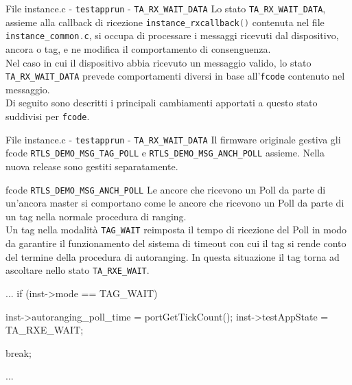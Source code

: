 \begin{frame}{File instance.c - \lstinline[language=C]!testapprun! - \lstinline[language=C]!TA_RX_WAIT_DATA!}
  Lo stato \lstinline[language=C]!TA_RX_WAIT_DATA!, assieme alla callback di ricezione \lstinline[language=C]!instance_rxcallback()!
  contenuta nel file \lstinline[language=C]!instance_common.c!, si occupa di processare i messaggi ricevuti dal dispositivo,
  ancora o tag, e ne modifica il comportamento di consenguenza.\\
  Nel caso in cui il dispositivo abbia ricevuto un messaggio valido, lo stato \lstinline[language=C]!TA_RX_WAIT_DATA!
  prevede comportamenti diversi in base all'\lstinline[language=C]!fcode! contenuto nel messaggio.\\
  Di seguito sono descritti i principali \alert{cambiamenti} apportati a questo stato suddivisi
  per \lstinline[language=C]!fcode!.
\end{frame}

\begin{frame}[fragile, shrink=30]{File instance.c - \lstinline[language=C]!testapprun! - \lstinline[language=C]!TA_RX_WAIT_DATA!}
  Il firmware originale gestiva gli fcode \lstinline[language=C]!RTLS_DEMO_MSG_TAG_POLL! e
  \lstinline[language=C]!RTLS_DEMO_MSG_ANCH_POLL! assieme. Nella nuova release sono gestiti separatamente.
  \begin{block}{fcode \lstinline[language=C]!RTLS_DEMO_MSG_ANCH_POLL!}
    Le ancore che ricevono un Poll da parte di un'ancora master si comportano come le ancore
    che ricevono un Poll da parte di un tag nella normale procedura di ranging.\\
    Un tag nella modalità \lstinline[language=C]!TAG_WAIT! reimposta il tempo di ricezione del Poll in modo
    da garantire il funzionamento del sistema di timeout con cui il tag si rende conto del termine
    della procedura di autoranging. In questa situazione il tag torna ad ascoltare nello stato
    \lstinline[language=C]!TA_RXE_WAIT!.
    \begin{C}
      ...
      if (inst->mode == TAG_WAIT)
      {
        inst->autoranging_poll_time = portGetTickCount();
        inst->testAppState = TA_RXE_WAIT;

        break;
      }
      ...
    \end{C}
  \end{block}
\end{frame}

